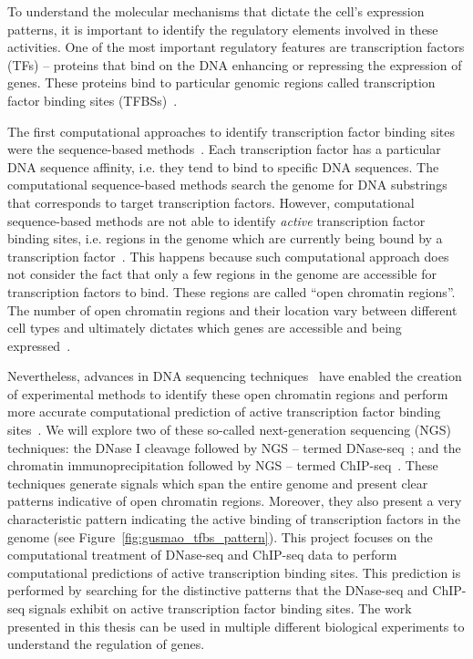 To understand the molecular mechanisms that dictate the cell's expression patterns, it is important to identify the regulatory elements involved in these activities. One of the most important regulatory features are transcription factors (TFs) -- proteins that bind on the DNA enhancing or repressing the expression of genes. These proteins bind to particular genomic regions called transcription factor binding sites (TFBSs)~\cite{maston2006}.

The first computational approaches to identify transcription factor binding sites were the sequence-based methods~\cite{stormo2000}. Each transcription factor has a particular DNA sequence affinity, i.e. they tend to bind to specific DNA sequences. The computational sequence-based methods search the genome for DNA substrings that corresponds to target transcription factors. However, computational sequence-based methods are not able to identify \emph{active} transcription factor binding sites, i.e. regions in the genome which are currently being bound by a transcription factor~\cite{pique2011}. This happens because such computational approach does not consider the fact that only a few regions in the genome are accessible for transcription factors to bind. These regions are called ``open chromatin regions''. The number of open chromatin regions and their location vary between different cell types and ultimately dictates which genes are accessible and being expressed~\cite{encode2012}.

Nevertheless, advances in DNA sequencing techniques~\cite{shendure2008} have enabled the creation of experimental methods to identify these open chromatin regions and perform more accurate computational prediction of active transcription factor binding sites~\cite{encode2012}. We will explore two of these so-called next-generation sequencing (NGS) techniques: the DNase I cleavage followed by NGS -- termed DNase-seq~\cite{crawford2004,sabo2004a}; and the chromatin immunoprecipitation followed by NGS -- termed ChIP-seq~\cite{johnson2007}. These techniques generate signals which span the entire genome and present clear patterns indicative of open chromatin regions. Moreover, they also present a very characteristic pattern indicating the active binding of transcription factors in the genome (see Figure~\ref{fig:gusmao_tfbs_pattern}). This project focuses on the computational treatment of DNase-seq and ChIP-seq data to perform computational predictions of active transcription binding sites. This prediction is performed by searching for the distinctive patterns that the DNase-seq and ChIP-seq signals exhibit on active transcription factor binding sites. The work presented in this thesis can be used in multiple different biological experiments to understand the regulation of genes.

